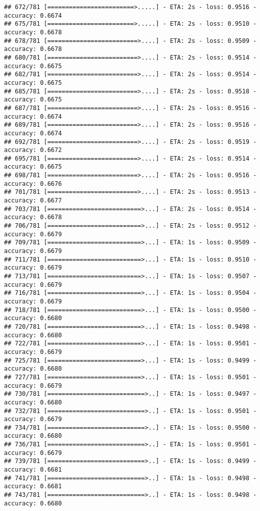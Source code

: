 \documentclass[
]{article}
\begin{document}
\begin{verbatim}
## 672/781 [========================>.....] - ETA: 2s - loss: 0.9516 - accuracy: 0.6674
## 675/781 [========================>.....] - ETA: 2s - loss: 0.9510 - accuracy: 0.6678
## 678/781 [=========================>....] - ETA: 2s - loss: 0.9509 - accuracy: 0.6678
## 680/781 [=========================>....] - ETA: 2s - loss: 0.9514 - accuracy: 0.6675
## 682/781 [=========================>....] - ETA: 2s - loss: 0.9514 - accuracy: 0.6675
## 685/781 [=========================>....] - ETA: 2s - loss: 0.9518 - accuracy: 0.6675
## 687/781 [=========================>....] - ETA: 2s - loss: 0.9516 - accuracy: 0.6674
## 689/781 [=========================>....] - ETA: 2s - loss: 0.9516 - accuracy: 0.6674
## 692/781 [=========================>....] - ETA: 2s - loss: 0.9519 - accuracy: 0.6672
## 695/781 [=========================>....] - ETA: 2s - loss: 0.9514 - accuracy: 0.6675
## 698/781 [=========================>....] - ETA: 2s - loss: 0.9516 - accuracy: 0.6676
## 701/781 [=========================>....] - ETA: 2s - loss: 0.9513 - accuracy: 0.6677
## 703/781 [==========================>...] - ETA: 2s - loss: 0.9514 - accuracy: 0.6678
## 706/781 [==========================>...] - ETA: 2s - loss: 0.9512 - accuracy: 0.6679
## 709/781 [==========================>...] - ETA: 1s - loss: 0.9509 - accuracy: 0.6679
## 711/781 [==========================>...] - ETA: 1s - loss: 0.9510 - accuracy: 0.6679
## 713/781 [==========================>...] - ETA: 1s - loss: 0.9507 - accuracy: 0.6679
## 716/781 [==========================>...] - ETA: 1s - loss: 0.9504 - accuracy: 0.6679
## 718/781 [==========================>...] - ETA: 1s - loss: 0.9500 - accuracy: 0.6680
## 720/781 [==========================>...] - ETA: 1s - loss: 0.9498 - accuracy: 0.6680
## 722/781 [==========================>...] - ETA: 1s - loss: 0.9501 - accuracy: 0.6679
## 725/781 [==========================>...] - ETA: 1s - loss: 0.9499 - accuracy: 0.6680
## 727/781 [==========================>...] - ETA: 1s - loss: 0.9501 - accuracy: 0.6679
## 730/781 [===========================>..] - ETA: 1s - loss: 0.9497 - accuracy: 0.6680
## 732/781 [===========================>..] - ETA: 1s - loss: 0.9501 - accuracy: 0.6679
## 734/781 [===========================>..] - ETA: 1s - loss: 0.9500 - accuracy: 0.6680
## 736/781 [===========================>..] - ETA: 1s - loss: 0.9501 - accuracy: 0.6679
## 739/781 [===========================>..] - ETA: 1s - loss: 0.9499 - accuracy: 0.6681
## 741/781 [===========================>..] - ETA: 1s - loss: 0.9498 - accuracy: 0.6681
## 743/781 [===========================>..] - ETA: 1s - loss: 0.9498 - accuracy: 0.6680

\end{verbatim}
\end{document}

